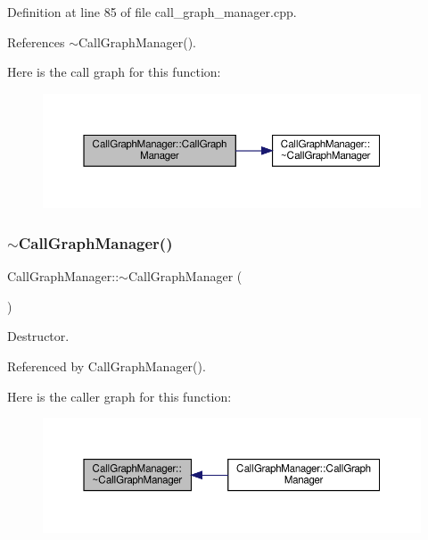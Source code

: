 Definition at line 85 of file call\+\_\+graph\+\_\+manager.\+cpp.



References $\sim$\+Call\+Graph\+Manager().

Here is the call graph for this function\+:
\nopagebreak
\begin{figure}[H]
\begin{center}
\leavevmode
\includegraphics[width=350pt]{d5/d96/classCallGraphManager_aeee8a134a4099c553dfed2726156f233_cgraph}
\end{center}
\end{figure}
\mbox{\label{classCallGraphManager_a39f42d18b82be5d809c01a223f01a8c7}} 
\subsubsection{\texorpdfstring{$\sim$\+Call\+Graph\+Manager()}{~CallGraphManager()}}
{\footnotesize\ttfamily Call\+Graph\+Manager\+::$\sim$\+Call\+Graph\+Manager (\begin{DoxyParamCaption}{ }\end{DoxyParamCaption})\hspace{0.3cm}{\ttfamily [default]}}



Destructor. 



Referenced by Call\+Graph\+Manager().

Here is the caller graph for this function\+:
\nopagebreak
\begin{figure}[H]
\begin{center}
\leavevmode
\includegraphics[width=350pt]{d5/d96/classCallGraphManager_a39f42d18b82be5d809c01a223f01a8c7_icgraph}
\end{center}
\end{figure}


